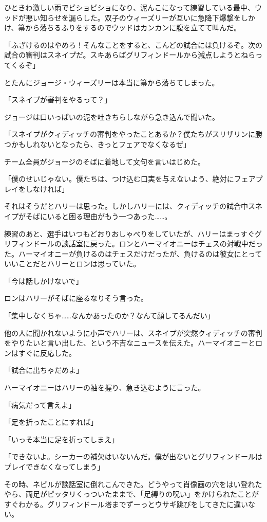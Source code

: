 \documentclass[10pt,a4paper]{article}
\begin{document}
\begin{CJK}{UTF8}{min}
ひときわ激しい雨でビショビショになり、泥んこになって練習している最中、ウッドが悪い知らせを漏らした。双子のウィーズリーが互いに急降下爆撃をしかけ、箒から落ちるふりをするのでウッドはカンカンに腹を立てて叫んだ。

「ふざけるのはやめろ！そんなことをすると、こんどの試合には負けるぞ。次の試合の審判はスネイプだ。スキあらばグリフィンドールから減点しようとねらってくるぞ」

とたんにジョージ・ウィーズリーは本当に箒から落ちてしまった。

「スネイプが審判をやるって？」

ジョージは口いっぱいの泥を吐きちらしながら急き込んで聞いた。

「スネイプがクィディッチの審判をやったことあるか？僕たちがスリザリンに勝つかもしれないとなったら、きっとフェアでなくなるぜ」

チーム全員がジョージのそばに着地して文句を言いはじめた。

「僕のせいじゃない。僕たちは、つけ込む口実を与えないよう、絶対にフェアプレイをしなければ」

それはそうだとハリーは思った。しかしハリーには、クィディッチの試合中スネイプがそばにいると困る理由がもう一つあった……。

練習のあと、選手はいつもどおりおしゃべりをしていたが、ハリーはまっすぐグリフィンドールの談話室に戻った。ロンとハーマイオニーはチェスの対戦中だった。ハーマイオニーが負けるのはチェスだけだったが、負けるのは彼女にとっていいことだとハリーとロンは思っていた。

「今は話しかけないで」

ロンはハリーがそばに座るなりそう言った。

「集中しなくちゃ……なんかあったのか？なんて顔してるんだい」

他の人に聞かれないように小声でハリーは、スネイプが突然クィディッチの審判をやりたいと言い出した、という不吉なニュースを伝えた。ハーマイオニーとロンはすぐに反応した。

「試合に出ちゃだめよ」

ハーマイオニーはハリーの袖を握り、急き込むように言った。

「病気だって言えよ」

「足を折ったことにすれば」

「いっそ本当に足を折ってしまえ」

「できないよ。シーカーの補欠はいないんだ。僕が出ないとグリフィンドールはプレイできなくなってしまう」

その時、ネビルが談話室に倒れこんできた。どうやって肖像画の穴をはい登れたやら、両足がピッタリくっついたままで、「足縛りの呪い」をかけられたことがすぐわかる。グリフィンドール塔までずーっとウサギ跳びをしてきたに違いない。


\end{CJK}
\end{document}
